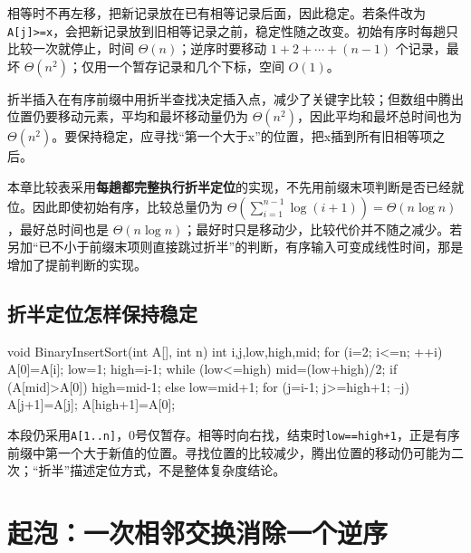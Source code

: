 相等时不再左移，把新记录放在已有相等记录后面，因此稳定。若条件改为 \texttt{A[\allowbreak{}j]\allowbreak{}>\allowbreak{}=\allowbreak{}x}，会把新记录放到旧相等记录之前，稳定性随之改变。初始有序时每趟只比较一次就停止，时间 \(\Theta(n)\)；逆序时要移动 \(1+2+\cdots+(n-1)\) 个记录，最坏 \(\Theta(n^2)\)；仅用一个暂存记录和几个下标，空间 \(O(1)\)。

折半插入在有序前缀中用折半查找决定插入点，减少了关键字比较；但数组中腾出位置仍要移动元素，平均和最坏移动量仍为 \(\Theta(n^2)\)，因此平均和最坏总时间也为 \(\Theta(n^2)\)。要保持稳定，应寻找``第一个大于x''的位置，把x插到所有旧相等项之后。

本章比较表采用\textbf{每趟都完整执行折半定位}的实现，不先用前缀末项判断是否已经就位。因此即使初始有序，比较总量仍为 \(\Theta(\sum_{i=1}^{n-1}\log(i+1))=\Theta(n\log n)\)，最好总时间也是 \(\Theta(n\log n)\)；最好时只是移动少，比较代价并不随之减少。若另加``已不小于前缀末项则直接跳过折半''的判断，有序输入可变成线性时间，那是增加了提前判断的实现。

\subsection{折半定位怎样保持稳定}\label{DS08-bin-insert}

\par\medskip\noindent\begin{minipage}{\linewidth}
\begin{codeblock}[language=C++]
void BinaryInsertSort(int A[], int n) {
    int i,j,low,high,mid;
    for (i=2; i<=n; ++i) {
        A[0]=A[i];
        low=1; high=i-1;
        while (low<=high) {
            mid=(low+high)/2;
            if (A[mid]>A[0]) high=mid-1;
            else low=mid+1;
        }
        for (j=i-1; j>=high+1; --j) A[j+1]=A[j];
        A[high+1]=A[0];
    }
}
\end{codeblock}
\end{minipage}\par\medskip

本段仍采用\texttt{A[\allowbreak{}1.\allowbreak{}.\allowbreak{}n]\allowbreak{}}，0号仅暂存。相等时向右找，结束时\texttt{low=\allowbreak{}=\allowbreak{}high+\allowbreak{}1}，正是有序前缀中第一个大于新值的位置。寻找位置的比较减少，腾出位置的移动仍可能为二次；``折半''描述定位方式，不是整体复杂度结论。

\section{起泡：一次相邻交换消除一个逆序}\label{DS08-03}


